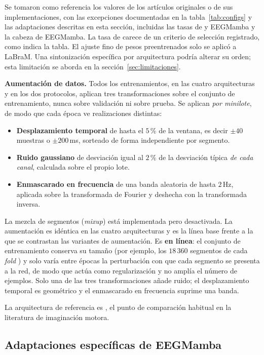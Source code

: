 Se tomaron como referencia los valores de los artículos originales o de sus implementaciones, con las excepciones documentadas en la tabla~\ref{tab:configs} y las adaptaciones descritas en esta sección, incluidas las tasas de \eegnet{} y EEGMamba y la cabeza de EEGMamba. La tasa de \eegnet{} carece de un criterio de selección registrado, como indica la tabla. El ajuste fino de pesos preentrenados solo se aplicó a LaBraM. Una sintonización específica por arquitectura podría alterar su orden; esta limitación se aborda en la sección~\ref{sec:limitaciones}.

\textbf{Aumentación de datos.} Todos los entrenamientos, en las cuatro arquitecturas y
en los dos protocolos, aplican tres transformaciones sobre el conjunto de entrenamiento,
nunca sobre validación ni sobre prueba. Se aplican \emph{por minilote}, de modo que cada
época ve realizaciones distintas:

\begin{itemize}
  \item \textbf{Desplazamiento temporal} de hasta el $5$\,\% de la ventana, es decir
  $\pm 40$ muestras o $\pm 200$\,ms, sorteado de forma independiente por segmento.
  \item \textbf{Ruido gaussiano} de desviación igual al $2$\,\% de la desviación típica
  \emph{de cada canal}, calculada sobre el propio lote.
  \item \textbf{Enmascarado en frecuencia} de una banda aleatoria de hasta $2$\,Hz,
  aplicada sobre la transformada de Fourier y deshecha con la transformada inversa.
\end{itemize}

La mezcla de segmentos (\textit{mixup}) está implementada pero desactivada. La
aumentación es idéntica en las cuatro arquitecturas y es la línea base frente a la que se
contrastan las variantes de aumentación. Es \textbf{en línea}: el conjunto de entrenamiento
conserva su tamaño (por ejemplo, los $18\,360$ segmentos de cada \textit{fold} \loso{}) y
solo varía entre épocas la perturbación con que cada segmento se presenta a la red, de modo
que actúa como regularización y no amplía el número de ejemplos. Solo una de las tres
transformaciones añade ruido; el desplazamiento temporal es geométrico y el enmascarado en
frecuencia suprime una banda.

La arquitectura de referencia es \eegnet{} \cite{lawhern2018}, el punto de comparación
habitual en la literatura de imaginación motora.

\subsection{Adaptaciones específicas de EEGMamba}
\label{sec:eegmamba-adapt}

